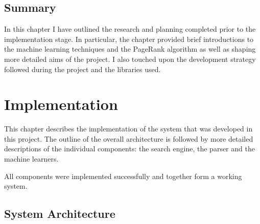 \documentclass[12pt,notitlepage,twoside]{scrreprt}
\begin{document}
\section{Summary}
In this chapter I have outlined the research and planning completed prior to the
implementation stage. In particular, the chapter provided brief introductions to the machine
learning techniques and the PageRank algorithm as well as shaping more detailed aims of
the project. I also touched upon the development strategy followed during the project 
and the libraries used.

\cleardoublepage

\chapter{Implementation}
This chapter describes the implementation of the system that was developed in this
project. The outline of the overall architecture is followed by more detailed descriptions
of the individual components: the search engine, the parser and the machine learners.

All components were implemented successfully and together form a working system.
\section{System Architecture}
\end{document}
